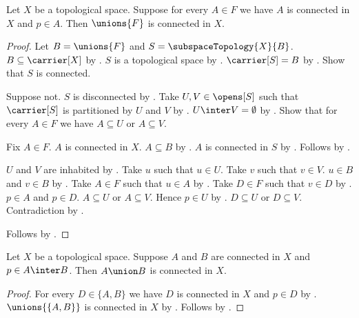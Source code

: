 \begin{theorem}\label{union_of_connected_subsets_with_common_point}
    Let $X$ be a topological space.
    Suppose for every $A\in F$ we have $A$ is connected in $X$ and $p\in A$.
    Then $\unions{F}$ is connected in $X$.
\end{theorem}
\begin{proof}
    Let $B=\unions{F}$ and $S=\subspaceTopology{X}{B}$.
    $B\subseteq\carrier[X]$ by .
    $S$ is a topological space by .
    $\carrier[S]=B$ by .
    Show that $S$ is connected.
    \begin{subproof}
        Suppose not.
        $S$ is disconnected by .
        Take $U,V\in\opens[S]$ such that $\carrier[S]$ is partitioned by $U$ and $V$ by
            .
        $U\inter V=\emptyset$ by .
        Show that for every $A\in F$ we have $A\subseteq U$ or $A\subseteq V$.
        \begin{subproof}
            Fix $A\in F$.
            $A$ is connected in $X$.
            $A\subseteq B$ by .
            $A$ is connected in $S$ by .
            Follows by .
        \end{subproof}
        $U$ and $V$ are inhabited by .
        Take $u$ such that $u\in U$.
        Take $v$ such that $v\in V$.
        $u\in B$ and $v\in B$ by .
        Take $A\in F$ such that $u\in A$ by .
        Take $D\in F$ such that $v\in D$ by .
        $p\in A$ and $p\in D$.
        $A\subseteq U$ or $A\subseteq V$.
        Hence $p\in U$ by .
        $D\subseteq U$ or $D\subseteq V$.
        Contradiction by .
    \end{subproof}
    Follows by .
\end{proof}

\begin{corollary}\label{union_of_intersecting_connected_subsets}
    Let $X$ be a topological space.
    Suppose $A$ and $B$ are connected in $X$ and $p\in A\inter B$.
    Then $A\union B$ is connected in $X$.
\end{corollary}
\begin{proof}
    For every $D\in\{A,B\}$ we have $D$ is connected in $X$ and $p\in D$ by
        .
    $\unions{\{A,B\}}$ is connected in $X$ by
        .
    Follows by .
\end{proof}
